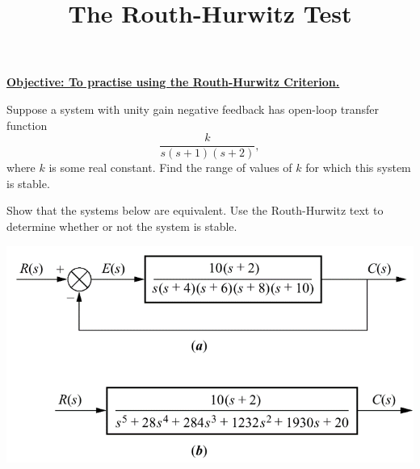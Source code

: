 \documentclass{article}
\begin{document}
\title{The Routh-Hurwitz Test}
\date{}

\maketitle
\thispagestyle{empty}

\Large

\vskip -10mm

\textbf{\underline{Objective: To practise using the Routh-Hurwitz Criterion.}}



\vspace{5mm}





Suppose a system with unity gain negative feedback has open-loop transfer function
\[\frac{k}{s(s+1)(s+2)},\]
where $k$ is some real constant. Find the range of values of $k$ for which this system is stable.


\clearpage


Show that the systems below are equivalent. Use the Routh-Hurwitz text to determine whether or not the system is stable.

\includegraphics[scale=0.7]{HardPoles.png} 
\end{document}

